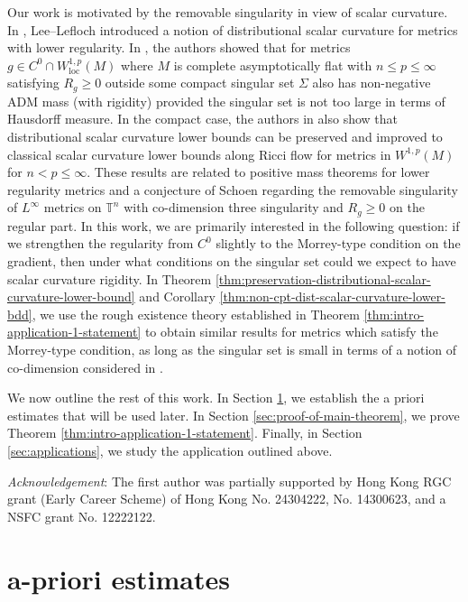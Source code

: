 \documentclass[12pt]{amsart}
\theoremstyle{plain}
\theoremstyle{plain}
\theoremstyle{definition}
\theoremstyle{remark}
\numberwithin{equation}{subsection}
\begin{document}
Our work is motivated by the removable singularity in view of scalar curvature. In \cite{lee_positive_2015}, Lee--Lefloch introduced a notion of distributional scalar curvature for metrics with lower regularity. In \cite{jiang_removable_2022}, the authors showed that for metrics $g \in C^0 \cap W^{1,p}_{\text{loc}}(M)$ where $M$ is complete asymptotically flat with $n \leq p \leq \infty$ satisfying $R_g \geq 0$ outside some compact singular set $\Sigma$ also has non-negative ADM mass (with rigidity) provided the singular set is not too large in terms of Hausdorff measure. In the compact case,  the authors in \cite{jiang_weak_2021} also show that distributional scalar curvature lower bounds can be preserved and improved to classical scalar curvature lower bounds along Ricci flow for metrics in $W^{1,p}(M)$ for $n < p \leq \infty$. These results are related to positive mass theorems for lower regularity metrics and a conjecture of Schoen regarding the removable singularity of $L^\infty$ metrics on $\mathbb{T}^n$ with co-dimension three singularity and $R_g \geq 0$ on the regular part. In this work, we are primarily interested in the following question: if we strengthen the regularity from $C^0$ slightly to the Morrey-type condition on the gradient, then under what conditions on the singular set could we expect to have scalar curvature rigidity. In Theorem \ref{thm:preservation-distributional-scalar-curvature-lower-bound} and Corollary \ref{thm:non-cpt-dist-scalar-curvature-lower-bdd}, we use the rough existence theory established in Theorem \ref{thm:intro-application-1-statement} to obtain similar results for metrics which satisfy the Morrey-type condition, as long as the singular set is small in terms of a notion of co-dimension considered in \cite{lee_continuous_2021}.

We now outline the rest of this work. In Section \ref{sec:a-priori-estimates}, we establish the a priori estimates that will be used later. In Section \ref{sec:proof-of-main-theorem}, we prove Theorem \ref{thm:intro-application-1-statement}. Finally, in Section \ref{sec:applications}, we study the application outlined above.

{\it Acknowledgement}: The first author was partially supported by Hong Kong RGC grant (Early Career Scheme) of Hong Kong No. 24304222, No. 14300623, and a NSFC grant No. 12222122.

\section{a-priori estimates}\label{sec:a-priori-estimates}
\end{document}
